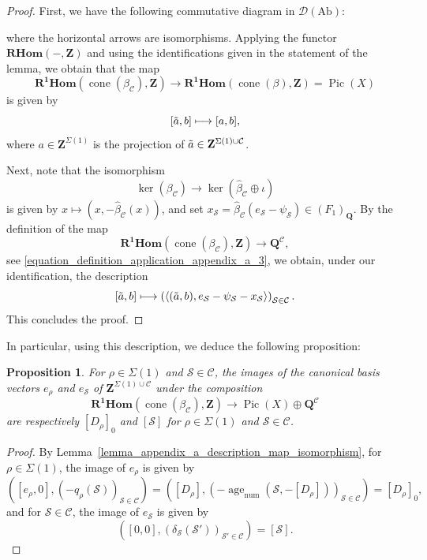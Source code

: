 \documentclass{proc-l}
\newcommand{\Z}{\mathbf{Z}}
\newcommand{\Q}{\mathbf{Q}}
\DeclareMathOperator{\Pic}{Pic}
\DeclareMathOperator{\coneform}{cone}
\DeclareMathOperator{\num}{num}
\DeclareMathOperator{\age}{age}
\newcommand{\stackS}{\mathcal{S}}
\newtheorem{prop}[theorem]{Proposition}
\theoremstyle{definition}
\theoremstyle{remark}
\numberwithin{equation}{section}
\begin{document}
\begin{proof}
First, we have the following commutative diagram in $\mathcal{D}(\mathrm{Ab})$:
\begin{center}
\end{center}
where the horizontal arrows are isomorphisms. Applying the functor $\mathbf{RHom}(-,\Z)$ and using the identifications given in the statement of the lemma, we obtain that the map
\[
\mathbf{R^1 Hom}(\coneform(\beta_{\mathcal{C}}),\Z)
\longrightarrow
\mathbf{R^1 Hom}(\coneform(\beta),\Z) = \Pic(X)
\]
is given by
\[
[\Tilde{a},b] \longmapsto [a,b],
\]
where $a \in \Z^{\Sigma(1)}$ is the projection of $\Tilde{a} \in \Z^{\Sigma(1) \cup \mathcal{C}}$.

Next, note that the isomorphism
\[
\ker(\beta_{\mathcal{C}}) \longrightarrow \ker(\widehat{\beta}_\mathcal{C}\oplus \iota)
\]
is given by $x \mapsto (x,-\widehat{\beta}_\mathcal{C}(x))$, and set $x_{\stackS} = \widehat{\beta}_\mathcal{C}(e_{\stackS} - \psi_{\stackS}) \in (F_{1})_{\Q}$. By the definition of the map
\[
\mathbf{R^1 Hom}(\coneform(\beta_{\mathcal{C}}),\Z) \longrightarrow \Q^{\mathcal{C}},
\]
see \eqref{equation_definition_application_appendix_a_3}, we obtain, under our identification, the description
\[
[\Tilde{a},b] \longmapsto \left( \left\langle (\Tilde{a},b) , e_{\stackS} - \psi_{\stackS} - x_{\stackS} \right\rangle \right)_{\stackS \in \mathcal{C}}.
\]
This concludes the proof.
\end{proof}


In particular, using this description, we deduce the following proposition:

\begin{prop}
For $\rho \in \Sigma(1)$ and $\stackS \in \mathcal{C}$, the images of the canonical basis vectors $e_{\rho}$ and $e_{\stackS}$ of $\Z^{\Sigma(1) \cup \mathcal C}$ under the composition
\[
\mathbf{R^1 Hom}(\coneform(\beta_{\mathcal{C}}),\Z) \longrightarrow \Pic(X) \oplus \Q^{\mathcal{C}}
\]
are respectively $[D_{\rho}]_0$ and $[\stackS]$ for $\rho \in \Sigma(1)$ and $\stackS \in \mathcal{C}$.
\end{prop}

\begin{proof}
By Lemma~\ref{lemma_appendix_a_description_map_isomorphism}, for $\rho \in \Sigma(1)$, the image of $e_{\rho}$ is given by
\[
\left( [e_{\rho},0] , \left(- q_{\rho}(\stackS) \right)_{\stackS \in \mathcal{C}} \right)
= \left( [D_{\rho}] , \left(- \age_{\num}(\stackS,-[D_{\rho}]) \right)_{\stackS \in \mathcal{C}} \right)
= [D_{\rho}]_0,
\]
and for $\stackS \in \mathcal{C}$, the image of $e_{\stackS}$ is given by
\[
\left( [0,0] , \left(\delta_{\stackS}(\stackS') \right)_{\stackS' \in \mathcal{C}} \right)
= [\stackS].
\]
\end{proof}
\end{document}
